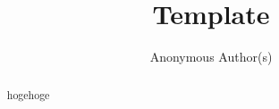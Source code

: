 \documentclass[
	11pt,
	a4,
	hyperref,
	utf8
]{article}
\title{Template}
\author{Anonymous Author(s)}
\date{}
\begin{document}
\maketitle

\begin{abstract}
	hogehoge
\end{abstract}


\printbibliography
\end{document}
